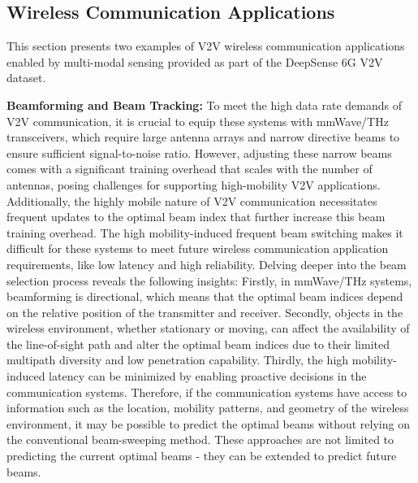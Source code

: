 \documentclass[10pt,comsoc]{IEEEtran}
\begin{document}
\subsection{Wireless Communication Applications} \label{subsec:wireless_application}

This section presents two examples of V2V wireless communication applications enabled by multi-modal sensing provided as part of the DeepSense 6G V2V dataset.

\textbf{Beamforming and Beam Tracking:} To meet the high data rate demands of V2V communication, it is crucial to equip these systems with mmWave/THz transceivers, which require large antenna arrays and narrow directive beams to ensure sufficient signal-to-noise ratio. However, adjusting these narrow beams comes with a significant training overhead that scales with the number of antennas, posing challenges for supporting high-mobility V2V applications. Additionally, the highly mobile nature of V2V communication necessitates frequent updates to the optimal beam index that further increase this beam training overhead. The high mobility-induced frequent beam switching makes it difficult for these systems to meet future wireless communication application requirements, like low latency and high reliability. Delving deeper into the beam selection process reveals the following insights: Firstly, in mmWave/THz systems, beamforming is directional, which means that the optimal beam indices depend on the relative position of the transmitter and receiver. Secondly, objects in the wireless environment, whether stationary or moving, can affect the availability of the line-of-sight path and alter the optimal beam indices due to their limited multipath diversity and low penetration capability. Thirdly, the high mobility-induced latency can be minimized by enabling proactive decisions in the communication systems. Therefore, if the communication systems have access to information such as the location, mobility patterns, and geometry of the wireless environment, it may be possible to predict the optimal beams without relying on the conventional beam-sweeping method. These approaches are not limited to predicting the current optimal beams - they can be extended to predict future beams. 
\end{document}
